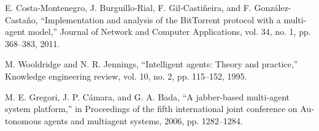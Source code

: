 \documentclass{report}
\begin{document}
\renewcommand*{\refname}{\section{منابع}}
\begin{thebibliography}{9}
\begin{latin}

E. Costa-Montenegro, J. Burguillo-Rial, F. Gil-Castiñeira, and F. González-Castaño, “Implementation and analysis of the BitTorrent protocol with a multi-agent model,” Journal of Network and Computer Applications, vol. 34, no. 1, pp. 368–383, 2011.

M. Wooldridge and N. R. Jennings, “Intelligent agents: Theory and practice,” Knowledge engineering review, vol. 10, no. 2, pp. 115–152, 1995.

M. E. Gregori, J. P. Cámara, and G. A. Bada, “A jabber-based multi-agent system platform,” in Proceedings of the fifth international joint conference on Autonomous agents and multiagent systems, 2006, pp. 1282–1284.

\end{latin}
\end{thebibliography}
\end{document}
